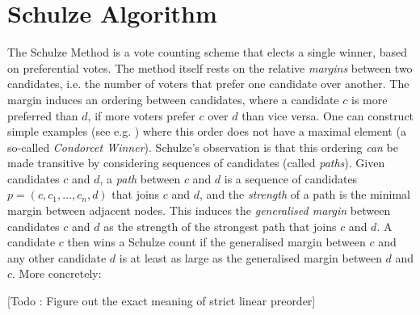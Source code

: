 \section{Schulze Algorithm}
The Schulze Method \cite{Schulze:2011:NMC} is a vote counting scheme
that elects a single winner, based on preferential votes. 
The method itself rests on the relative 
\emph{margins} between two candidates, i.e. the number of
voters that prefer one candidate over another.  The margin induces
an ordering between candidates, where a candidate $c$ is more
preferred than $d$, if more voters prefer $c$ over $d$ than 
vice versa. One can construct simple examples (see e.g.
\cite{Rivest:2010:OSW}) where this order does not have a maximal
element (a so-called \emph{Condorcet Winner}). Schulze's observation
is that this ordering \emph{can} be made transitive by considering
sequences of candidates (called \emph{paths}). Given candidates $c$
and $d$, a \emph{path} between $c$ and $d$ is a sequence of candidates
 $p = (c, c_1,\dots, c_n, d)$ that joins $c$ and $d$, and 
 the \emph{strength} of a
path is the minimal margin between adjacent nodes. This induces the
\emph{generalised margin} between candidates $c$ and $d$ as the
strength of the strongest path that joins $c$ and $d$. A candidate
$c$ then wins a Schulze count if the generalised margin between $c$
and any other candidate $d$ is at least as large as the generalised
margin between $d$ and $c$. More concretely:


[Todo : Figure out the exact meaning of strict linear preorder]

